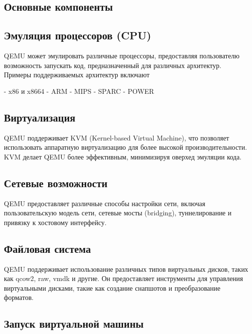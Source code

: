     \subsection{Основные компоненты}
    \subsection{Эмуляция процессоров (CPU)}
    QEMU может эмулировать различные процессоры, предоставляя пользователю возможность запускать код, предназначенный для различных архитектур. Примеры поддерживаемых архитектур включают
    \begin{itemize}
        - x86 и x8664
        - ARM
        - MIPS
        - SPARC
        - POWER
    \end{itemize}

    \subsection{Виртуализация}
    QEMU поддерживает KVM (Kernel-based Virtual Machine), что позволяет использовать аппаратную виртуализацию для более высокой производительности. KVM делает QEMU более эффективным, минимизируя оверхед эмуляции кода.

    \subsection{Сетевые возможности}
    QEMU предоставляет различные способы настройки сети, включая пользовательскую модель сети, сетевые мосты (bridging), туннелирование и привязку к хостовому интерфейсу.

    \subsection{Файловая система}
    QEMU поддерживает использование различных типов виртуальных дисков, таких как qcow2, raw, vmdk и другие. Он предоставляет инструменты для управления виртуальными дисками, такие как создание снапшотов и преобразование форматов.

    \subsection{Запуск виртуальной машины}

